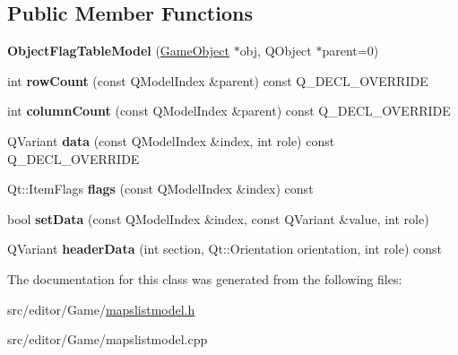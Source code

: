 \subsection*{Public Member Functions}
\begin{DoxyCompactItemize}
\item 
\hypertarget{class_object_flag_table_model_a0262c5ecc3313c3d803ce24ec6378080}{}\label{class_object_flag_table_model_a0262c5ecc3313c3d803ce24ec6378080} 
{\bfseries Object\+Flag\+Table\+Model} (\hyperlink{class_game_object}{Game\+Object} $\ast$obj, Q\+Object $\ast$parent=0)
\item 
\hypertarget{class_object_flag_table_model_a2c62cafdcddc9a64dac28baabbc3a233}{}\label{class_object_flag_table_model_a2c62cafdcddc9a64dac28baabbc3a233} 
int {\bfseries row\+Count} (const Q\+Model\+Index \&parent) const Q\+\_\+\+D\+E\+C\+L\+\_\+\+O\+V\+E\+R\+R\+I\+DE
\item 
\hypertarget{class_object_flag_table_model_a1ee21132633db3b8f5b14bdd223c9b43}{}\label{class_object_flag_table_model_a1ee21132633db3b8f5b14bdd223c9b43} 
int {\bfseries column\+Count} (const Q\+Model\+Index \&parent) const Q\+\_\+\+D\+E\+C\+L\+\_\+\+O\+V\+E\+R\+R\+I\+DE
\item 
\hypertarget{class_object_flag_table_model_a2eee998c6159d124e9bdf3334f21660a}{}\label{class_object_flag_table_model_a2eee998c6159d124e9bdf3334f21660a} 
Q\+Variant {\bfseries data} (const Q\+Model\+Index \&index, int role) const Q\+\_\+\+D\+E\+C\+L\+\_\+\+O\+V\+E\+R\+R\+I\+DE
\item 
\hypertarget{class_object_flag_table_model_ae7c6223e2891cf65d033c747364ab5b8}{}\label{class_object_flag_table_model_ae7c6223e2891cf65d033c747364ab5b8} 
Qt\+::\+Item\+Flags {\bfseries flags} (const Q\+Model\+Index \&index) const
\item 
\hypertarget{class_object_flag_table_model_a60e32db4479e6f6601d417bfa379c6be}{}\label{class_object_flag_table_model_a60e32db4479e6f6601d417bfa379c6be} 
bool {\bfseries set\+Data} (const Q\+Model\+Index \&index, const Q\+Variant \&value, int role)
\item 
\hypertarget{class_object_flag_table_model_a781172921846e4b7c70d3a73f82d405a}{}\label{class_object_flag_table_model_a781172921846e4b7c70d3a73f82d405a} 
Q\+Variant {\bfseries header\+Data} (int section, Qt\+::\+Orientation orientation, int role) const
\end{DoxyCompactItemize}


The documentation for this class was generated from the following files\+:\begin{DoxyCompactItemize}
\item 
src/editor/\+Game/\hyperlink{mapslistmodel_8h}{mapslistmodel.\+h}\item 
src/editor/\+Game/mapslistmodel.\+cpp\end{DoxyCompactItemize}
